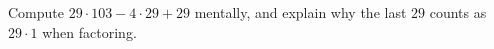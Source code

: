 Compute $29\cdot103-4\cdot29+29$ mentally, and explain why the last $29$ counts as $29\cdot1$ when factoring.
